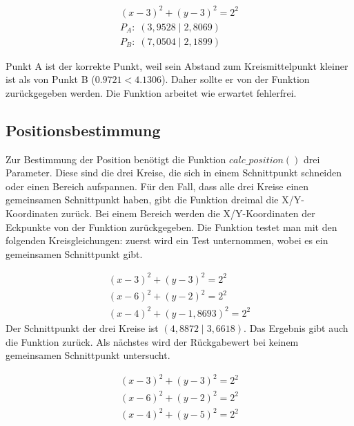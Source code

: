 \begin{equation*}
\label{eq:unit_test_abstand_zweier_punkte}
\begin{split}
(x - 3)^{2} + (y - 3)^{2} = 2^{2}\\
P_{A}: \; (3,9528 \;|\; 2,8069)\\
P_{B}: \; (7,0504 \;|\; 2,1899)
\end{split}
\end{equation*}

Punkt \si{A} ist der korrekte Punkt, weil sein Abstand zum Kreismittelpunkt kleiner ist als von Punkt \si{B} ($0.9721 < 4.1306$). Daher sollte er von der Funktion zurückgegeben werden. Die Funktion arbeitet wie erwartet fehlerfrei.

\subsection{Positionsbestimmung}
Zur Bestimmung der Position benötigt die Funktion $calc\_position()$ drei Parameter. Diese sind die drei Kreise, die sich in einem Schnittpunkt schneiden oder einen Bereich aufspannen. Für den Fall, dass alle drei Kreise einen gemeinsamen Schnittpunkt haben, gibt die Funktion dreimal die X/Y-Koordinaten zurück. Bei einem Bereich werden die X/Y-Koordinaten der Eckpunkte von der Funktion zurückgegeben. Die Funktion testet man mit den folgenden Kreisgleichungen: zuerst wird ein Test unternommen, wobei es ein gemeinsamen Schnittpunkt gibt.

\begin{equation*}
\label{eq:unit_test_positionsbestimmung}
\begin{split}
(x - 3)^{2} + (y - 3)^{2} = 2^{2} \\
(x - 6)^{2} + (y - 2)^{2} = 2^{2} \\
(x - 4)^{2} + (y - 1,8693)^{2} = 2^{2}
\end{split}
\end{equation*}
Der Schnittpunkt der drei Kreise ist $( 4,8872 \;|\; 3,6618)$. Das Ergebnis gibt auch die Funktion zurück. Als nächstes wird der Rückgabewert bei keinem gemeinsamen Schnittpunkt untersucht.

\begin{equation*}
\label{eq:unit_test_positionsbestimmung}
\begin{split}
(x - 3)^{2} + (y - 3)^{2} = 2^{2} \\
(x - 6)^{2} + (y - 2)^{2} = 2^{2} \\
(x - 4)^{2} + (y - 5)^{2} = 2^{2}
\end{split}
\end{equation*}

